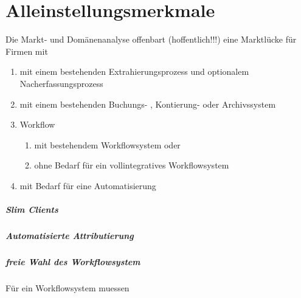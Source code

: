 \chapter{Alleinstellungsmerkmale}

\begin{comment}
Alleinstellungsmerkmale sind jene Merkmale oder Funktionalitäten, die das System auszeichnen und sich somit gegenüber anderen Systemen abhebt. Die Alleinstellungsmerkmale lassen sich oft aus der Marktrecherche ableiten bzw. daraus argumentieren. 
\end{comment}


Die Markt- und Domänenanalyse offenbart (hoffentlich!!!) eine Marktlücke für Firmen mit
\begin{enumerate}
\item mit einem bestehenden Extrahierungsprozess und optionalem Nacherfassungsprozess
\item mit einem bestehenden Buchungs- , Kontierung- oder Archivssystem
\item Workflow
\begin{enumerate}
\item mit bestehendem Workflowsystem oder
\item ohne Bedarf für ein vollintegratives Workflowsystem
\end{enumerate}
\item mit Bedarf für eine Automatisierung
\end{enumerate}


%
\paragraph{Slim Clients}


\paragraph{Automatisierte Attributierung}


%
\paragraph{freie Wahl des Workflowsystem}
Für ein Workflowsystem muessen 






